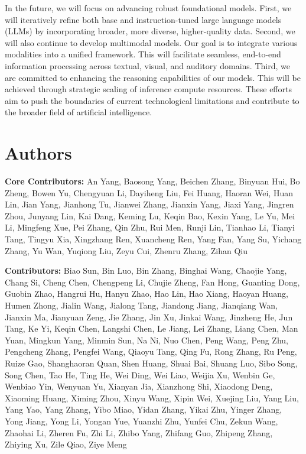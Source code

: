 \documentclass{article}
\begin{document}
In the future, we will focus on advancing robust foundational models. 
First, we will iteratively refine both base and instruction-tuned large language models (LLMs) by incorporating broader, more diverse, higher-quality data.
Second, we will also continue to develop multimodal models. Our goal is to integrate various modalities into a unified framework. This will facilitate seamless, end-to-end information processing across textual, visual, and auditory domains.
Third, we are committed to enhancing the reasoning capabilities of our models. This will be achieved through strategic scaling of inference compute resources. 
These efforts aim to push the boundaries of current technological limitations and contribute to the broader field of artificial intelligence.

\section{Authors}

\textbf{Core Contributors:} An Yang, Baosong Yang, Beichen Zhang, Binyuan Hui, Bo Zheng, Bowen Yu, Chengyuan Li, Dayiheng Liu, Fei Huang, Haoran Wei, Huan Lin, Jian Yang, Jianhong Tu, Jianwei Zhang, Jianxin Yang, Jiaxi Yang, Jingren Zhou, Junyang Lin, Kai Dang, Keming Lu, Keqin Bao, Kexin Yang, Le Yu, Mei Li, Mingfeng Xue, Pei Zhang, Qin Zhu, Rui Men, Runji Lin, Tianhao Li, Tianyi Tang, Tingyu Xia, Xingzhang Ren, Xuancheng Ren, Yang Fan, Yang Su, Yichang Zhang, Yu Wan, Yuqiong Liu, Zeyu Cui, Zhenru Zhang, Zihan Qiu

\textbf{Contributors:} Biao Sun, Bin Luo, Bin Zhang, Binghai Wang, Chaojie Yang, Chang Si, Cheng Chen, Chengpeng Li, Chujie Zheng, Fan Hong, Guanting Dong, Guobin Zhao, Hangrui Hu, Hanyu Zhao, Hao Lin, Hao Xiang, Haoyan Huang, Humen Zhong, Jialin Wang, Jialong Tang, Jiandong Jiang, Jianqiang Wan, Jianxin Ma, Jianyuan Zeng, Jie Zhang, Jin Xu, Jinkai Wang, Jinzheng He, Jun Tang, Ke Yi, Keqin Chen, Langshi Chen, Le Jiang, Lei Zhang, Liang Chen, Man Yuan, Mingkun Yang, Minmin Sun, Na Ni, Nuo Chen, Peng Wang, Peng Zhu, Pengcheng Zhang, Pengfei Wang, Qiaoyu Tang, Qing Fu, Rong Zhang, Ru Peng, Ruize Gao, Shanghaoran Quan, Shen Huang, Shuai Bai, Shuang Luo, Sibo Song, Song Chen, Tao He, Ting He, Wei Ding, Wei Liao, Weijia Xu, Wenbin Ge, Wenbiao Yin, Wenyuan Yu, Xianyan Jia, Xianzhong Shi, Xiaodong Deng, Xiaoming Huang, Ximing Zhou, Xinyu Wang, Xipin Wei, Xuejing Liu, Yang Liu, Yang Yao, Yang Zhang, Yibo Miao, Yidan Zhang, Yikai Zhu, Yinger Zhang, Yong Jiang, Yong Li, Yongan Yue, Yuanzhi Zhu, Yunfei Chu, Zekun Wang, Zhaohai Li, Zheren Fu, Zhi Li, Zhibo Yang, Zhifang Guo, Zhipeng Zhang, Zhiying Xu, Zile Qiao, Ziye Meng



\end{document}

